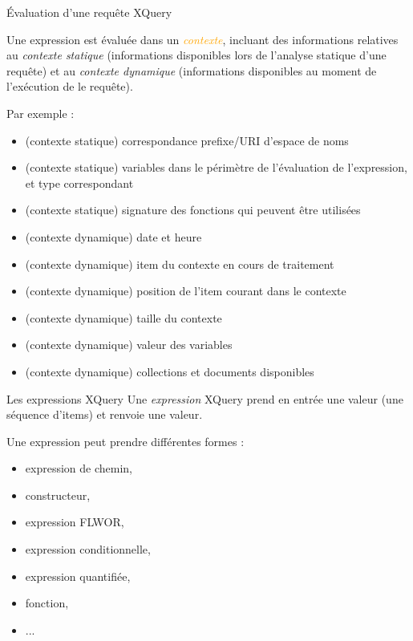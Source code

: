 \begin{frame}{\'Evaluation d'une requête XQuery}

Une expression est évaluée dans un \textcolor{orange}{\textit{contexte}}, incluant des informations relatives au \textit{contexte statique} (informations disponibles lors de l'analyse statique d'une requête) et au \textit{contexte dynamique} (informations disponibles au moment de l'exécution de le requête).

\medskip

Par exemple :

\begin{itemize}
\item (contexte statique) correspondance prefixe/URI d'espace de noms
\item (contexte statique) variables dans le périmètre de l'évaluation de l'expression, et type correspondant
\item (contexte statique) signature des fonctions qui peuvent être utilisées
\item (contexte dynamique) date et heure
\item (contexte dynamique) item du contexte en cours de traitement
\item (contexte dynamique) position de l'item courant dans le contexte
\item (contexte dynamique) taille du contexte
\item (contexte dynamique) valeur des variables
\item (contexte dynamique) collections et documents disponibles
\end{itemize}

\end{frame}

\begin{frame}[containsverbatim]{Les expressions XQuery}
Une \textit{expression} XQuery prend en entrée une valeur (une séquence d'items) et renvoie une valeur.

\bigskip

Une expression peut prendre différentes formes :
\begin{itemize}
\item expression de chemin,
\item constructeur,
\item expression FLWOR,
\item expression conditionnelle,
\item expression quantifiée,
\item fonction,
\item ...
\end{itemize}

\end{frame}

